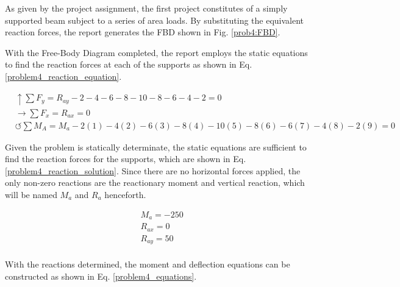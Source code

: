 \documentclass[a4paper]{article}
\begin{document}
As given by the project assignment, the first project constitutes of a simply supported beam subject to a series of area loads. By substituting the equivalent reaction forces, the report generates the FBD shown in Fig. \ref{prob4:FBD}.

With the Free-Body Diagram completed, the report employs the static equations to find the reaction forces at each of the supports as shown in Eq. \ref{problem4_reaction_equation}.

\begin{equation}
\begin{split}
	&\uparrow \sum F_y = R_{ay} -2 -4 -6 -8 -10 -8 -6 -4 -2 = 0 \\
 	&\rightarrow \sum F_x = R_{ax} = 0 \\
 	&\circlearrowleft \sum M_A = M_a -2(1) -4(2) -6(3) -8(4) -10(5) -8(6) -6(7)- 4(8) -2(9) = 0
\end{split}
\label{problem4_reaction_equation}
\end{equation}

Given the problem is statically determinate, the static equations are sufficient to find the reaction forces for the supports, which are shown in Eq. \ref{problem4_reaction_solution}. Since there are no horizontal forces applied, the only non-zero reactions are the reactionary moment and vertical reaction, which will be named $M_a$ and $R_a$ henceforth.

\begin{equation}
\begin{split}
	& M_a = -250 \\
	& R_{ax} = 0 \\
	& R_{ay} = 50 \\
\end{split}
\label{problem4_reaction_solution}
\end{equation}

With the reactions determined, the moment and deflection equations can be constructed as shown in Eq. \ref{problem4_equations}.
\end{document}
